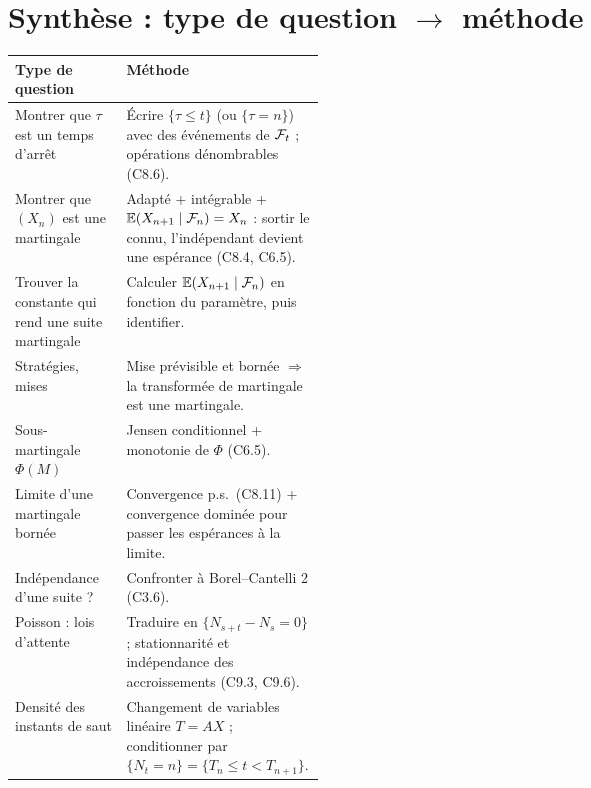 \documentclass[11pt,a4paper]{article}
\begin{document}
\section*{Synthèse : type de question $\to$ méthode}
\renewcommand{\arraystretch}{1.3}
\begin{tabularx}{\linewidth}{@{}>{\raggedright\arraybackslash}p{0.36\linewidth}X@{}}
\toprule
Type de question & Méthode\\\midrule
Montrer que $\tau$ est un temps d'arrêt & Écrire $\{\tau\le t\}$ (ou $\{\tau=n\}$) avec des événements de $\mathcal{F}_t$ ; opérations dénombrables (C8.6).\\
Montrer que $(X_n)$ est une martingale & Adapté + intégrable + $\mathbb{E}(X_{n+1}\mid\mathcal{F}_n)=X_n$ : sortir le connu, l'indépendant devient une espérance (C8.4, C6.5).\\
Trouver la constante qui rend une suite martingale & Calculer $\mathbb{E}(X_{n+1}\mid\mathcal{F}_n)$ en fonction du paramètre, puis identifier.\\
Stratégies, mises & Mise prévisible et bornée $\Rightarrow$ la transformée de martingale est une martingale.\\
Sous-martingale $\Phi(M)$ & Jensen conditionnel + monotonie de $\Phi$ (C6.5).\\
Limite d'une martingale bornée & Convergence p.s.\ (C8.11) + convergence dominée pour passer les espérances à la limite.\\
Indépendance d'une suite ? & Confronter à Borel--Cantelli 2 (C3.6).\\
Poisson : lois d'attente & Traduire en $\{N_{s+t}-N_s=0\}$ ; stationnarité et indépendance des accroissements (C9.3, C9.6).\\
Densité des instants de saut & Changement de variables linéaire $T=AX$ ; conditionner par $\{N_t=n\}=\{T_n\le t<T_{n+1}\}$.\\\bottomrule
\end{tabularx}
\end{document}
